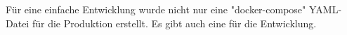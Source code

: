 
Für eine einfache Entwicklung wurde nicht nur eine "docker-compose" YAML-Datei für die Produktion erstellt. Es gibt auch eine für die Entwicklung.


